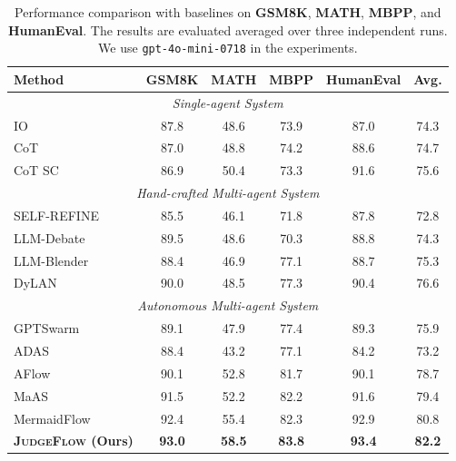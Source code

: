 \documentclass{article}
\theoremstyle{plain}
\theoremstyle{definition}
\theoremstyle{remark}
\def \our{\textsc{JudgeFlow}}
\begin{document}
\begin{table}[h]
  \centering
  \captionsetup{width=0.8\textwidth}
  \caption{Performance comparison with baselines on \textbf{GSM8K}, \textbf{MATH}, \textbf{MBPP}, and \textbf{HumanEval}. The results are evaluated averaged over three independent runs. We use \texttt{gpt-4o-mini-0718} in the experiments.}
  \label{tab:full_width}
    \begin{tabular}{l|cccc|c}
    \toprule
    \textbf{Method} & \textbf{GSM8K}  & \textbf{MATH} & \textbf{MBPP} & \textbf{HumanEval} & \textbf{Avg.} \\
    \midrule
    \multicolumn{6}{c}{\textit{Single-agent System}} \\
    \midrule
    IO & 87.8  & 48.6 & 73.9 & 87.0 & 74.3 \\
    CoT~\citep{wei2023chainofthoughtpromptingelicitsreasoning} & 87.0  & 48.8 & 74.2  & 88.6 & 74.7 \\
    CoT SC~\citep{wang2023selfconsistencyimproveschainthought} & 86.9  & 50.4 & 73.3  & 91.6 & 75.6 \\
    \midrule
    \multicolumn{6}{c}{\textit{Hand-crafted Multi-agent System}} \\
    \midrule
    SELF-REFINE~\citep{madaan_self-refine_nodate} & 85.5  & 46.1 & 71.8  & 87.8 & 72.8 \\
    LLM-Debate~\citep{du_improving_2023} & 89.5 & 48.6 & 70.3 & 88.8 & 74.3 \\
    LLM-Blender~\citep{jiang2023llmblenderensemblinglargelanguage} & 88.4 & 46.9 & 77.1 & 88.7 & 75.3 \\
    DyLAN~\citep{liu_dynamic_2024} & 90.0 & 48.5 & 77.3 & 90.4 & 76.6 \\
    \midrule
    \multicolumn{6}{c}{\textit{Autonomous Multi-agent System}} \\
    \midrule
    GPTSwarm~\citep{zhuge_language_2024} & 89.1 & 47.9 & 77.4 & 89.3 & 75.9 \\
    ADAS~\citep{hu_automated_2025} & 88.4 & 43.2 & 77.1 & 84.2 & 73.2 \\
    AFlow~\citep{zhang_aflow_2025} & 90.1 & 52.8 & 81.7 & 90.1 & 78.7 \\
    MaAS~\citep{zhang_multi-agent_2025} & 91.5 & 52.2 & 82.2 & 91.6 & 79.4 \\
    MermaidFlow~\citep{zheng_mermaidflow_2025} & 92.4 & 55.4 & 82.3 & 92.9 & 80.8\\
    \midrule
    \textbf{\our{} (Ours)} & \textbf{93.0} & \textbf{58.5} & \textbf{83.8} & \textbf{93.4} &  \textbf{82.2}\\
    \bottomrule
\end{tabular}
\end{table}
\end{document}
